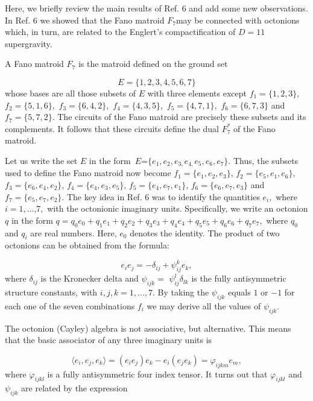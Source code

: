 \documentclass[a4paper,12pt]{article}
\begin{document}
\bigskip

Here, we briefly review the main results of Ref. 6 and add some new
observations. In Ref. 6 we showed that the Fano matroid $F_{7}$may be
connected with octonions which, in turn, are related to the Englert's
compactification of $D=11$ supergravity.

A Fano matroid $F_{7}$ is the matroid defined on the ground set

\[
E=\{1,2,3,4,5,6,7\} 
\]
whose bases are all those subsets of $E$ with three elements except $%
f_{1}=\{1,2,3\},$ $f_{2}=\{5,1,6\},$ $f_{3}=\{6,4,2\},$ $f_{4}=\{4,3,5\},$ $%
f_{5}=\{4,7,1\},$ $f_{6}=\{6,7,3\}$ and $f_{7}=\{5,7,2\}$. The circuits of
the Fano matroid are precisely these subsets and its complements. It follows
that these circuits define the dual $F_{7}^{\ast }$ of the Fano matroid.

Let us write the set $E$ in the form\textit{\ }$E$=$%
\{e_{1},e_{2},e_{3,}e_{4,}e_{5},e_{6},e_{7}\}$. Thus, the subsets used to
define the Fano matroid now become $f_{1}=\{e_{1},e_{2},e_{3}\}$, $%
f_{2}=\{e_{5},e_{1},e_{6}\}$, $f_{3}=\{e_{6},e_{4},e_{2}\}$, $%
f_{4}=\{e_{4},e_{3},e_{5}\}$, $f_{5}=\{e_{4},e_{7},e_{1}\}$, $%
f_{6}=\{e_{6},e_{7},e_{3}\}$ and $f_{7}=\{e_{5},e_{7},e_{2}\}$. The key idea
in Ref. 6 was to identify the quantities $e_{i},$ where $i=1,...$,$7,$ with
the octonionic imaginary units. Specifically, we write an octonion $q$ in
the form $%
q=q_{0}e_{0}+q_{1}e_{1}+q_{2}e_{2}+q_{3}e_{3}+q_{4}e_{4}+q_{5}e_{5}+q_{6}e_{6}
+q_{7}e_{7}, 
$ where $q_{0}$ and $q_{i}$ are real numbers. Here, $e_{0}$ denotes the
identity. The product of two octonions can be obtained from the formula:

\begin{equation}
e_{i}e_{j}=-\delta _{ij}+\psi _{ij}^{k}e_{k},  \label{1}
\end{equation}
where $\delta _{ij}$ is the Kronecker delta and $\psi _{ijk}=$ $\psi
_{ij}^{l}\delta _{lk}$ is the fully antisymmetric structure constants, with $%
i,j,k=1,...,7$. By taking the $\psi _{ijk}$ equals $1$ or $-1$ for each one
of the seven combinations $f_{i}$ we may derive all the values of $\psi
_{ijk}$.

The octonion (Cayley) algebra is not associative, but alternative. This
means that the basic associator of any three imaginary units is

\begin{equation}
\langle e_{i},e_{j},e_{k}\rangle
=(e_{i}e_{j})e_{k}-e_{i}(e_{j}e_{k})=\varphi _{ijkm}e_{m},  \label{2}
\end{equation}
where $\varphi _{ijkl}$ is a fully antisymmetric four index tensor. It turns
out that $\varphi _{ijkl}$ and $\psi _{ijk}$ are related by the expression
\end{document}
